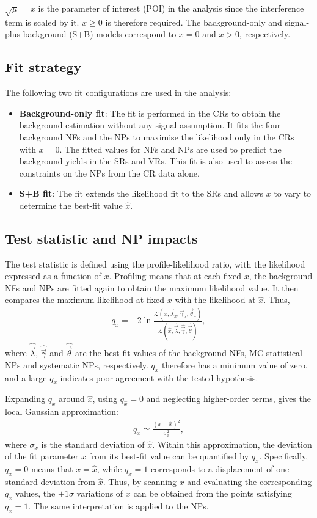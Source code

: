 $\sqrt{\mu}=x$ is the parameter of interest (POI) in the analysis since the interference term is scaled by it. $x\geq0$ is therefore required.
The background-only and signal-plus-background (S+B) models correspond to $x=0$ and $x>0$, respectively.

\subsection{Fit strategy}
\label{subsec:ch10_fit_strategy}
The following two fit configurations are used in the analysis:
\begin{itemize} 
  \item \textbf{Background-only fit}: The fit is performed in the CRs to obtain the background estimation without any signal assumption. It fits the four background NFs and the NPs to maximise the likelihood only in the CRs with $x=0$.
  The fitted values for NFs and NPs are used to predict the background yields in the SRs and VRs.
  This fit is also used to assess the constraints on the NPs from the CR data alone.
  \item \textbf{S+B fit}: The fit extends the likelihood fit to the SRs and allows $x$ to vary to determine the best-fit value $\hat{x}$.
\end{itemize}

\subsection{Test statistic and NP impacts}
The test statistic is defined using the profile-likelihood ratio, with the likelihood expressed as a function of $x$.
Profiling means that at each fixed $x$, the background NFs and NPs are fitted again to obtain the maximum likelihood value.
It then compares the maximum likelihood at fixed $x$ with the likelihood at $\hat{x}$.
Thus,
\begin{align*}
 q_x=-2\ln
 \frac{\mathcal{L}(x,\vec{\lambda}_{x},\vec{\gamma}_{x},\vec{\theta}_{x})}
      {\mathcal{L}(\hat{x},\hat{\vec{\lambda}},\hat{\vec{\gamma}},\hat{\vec{\theta}})},
\end{align*}
where $\hat{\vec{\lambda}}$, $\hat{\vec{\gamma}}$ and $\hat{\vec{\theta}}$ are the best-fit values of the background NFs, MC statistical NPs and systematic NPs, respectively. $q_x$ therefore has a minimum value of zero, and a large $q_x$ indicates poor agreement with the tested hypothesis.

Expanding $q_x$ around $\hat{x}$, using $q_{\hat{x}}=0$ and neglecting higher-order terms, gives the local Gaussian approximation:
\begin{align*}
 q_x\simeq\frac{(x-\hat{x})^2}{\sigma_x^2},
\end{align*}
where $\sigma_x$ is the standard deviation of $\hat{x}$.
Within this approximation, the deviation of the fit parameter $x$ from its best-fit value can be quantified by $q_x$.
Specifically, $q_x=0$ means that $x=\hat{x}$, while $q_x=1$ corresponds to a displacement of one standard deviation from $\hat{x}$.
Thus, by scanning $x$ and evaluating the corresponding $q_x$ values, the $\pm1\sigma$ variations of $x$ can be obtained from the points satisfying $q_x=1$.
The same interpretation is applied to the NPs.

